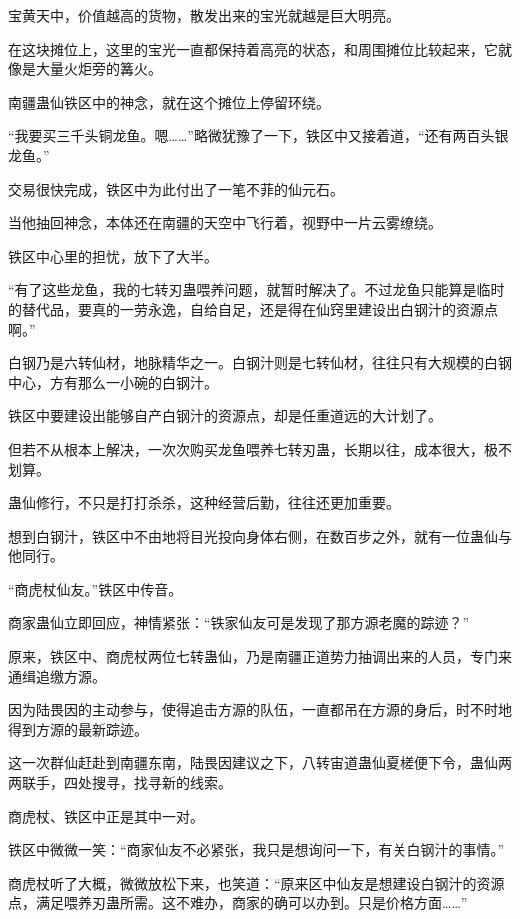 
\begin{this_body}

宝黄天中，价值越高的货物，散发出来的宝光就越是巨大明亮。

在这块摊位上，这里的宝光一直都保持着高亮的状态，和周围摊位比较起来，它就像是大量火炬旁的篝火。

南疆蛊仙铁区中的神念，就在这个摊位上停留环绕。

“我要买三千头铜龙鱼。嗯……”略微犹豫了一下，铁区中又接着道，“还有两百头银龙鱼。”

交易很快完成，铁区中为此付出了一笔不菲的仙元石。

当他抽回神念，本体还在南疆的天空中飞行着，视野中一片云雾缭绕。

铁区中心里的担忧，放下了大半。

“有了这些龙鱼，我的七转刃蛊喂养问题，就暂时解决了。不过龙鱼只能算是临时的替代品，要真的一劳永逸，自给自足，还是得在仙窍里建设出白钢汁的资源点啊。”

白钢乃是六转仙材，地脉精华之一。白钢汁则是七转仙材，往往只有大规模的白钢中心，方有那么一小碗的白钢汁。

铁区中要建设出能够自产白钢汁的资源点，却是任重道远的大计划了。

但若不从根本上解决，一次次购买龙鱼喂养七转刃蛊，长期以往，成本很大，极不划算。

蛊仙修行，不只是打打杀杀，这种经营后勤，往往还更加重要。

想到白钢汁，铁区中不由地将目光投向身体右侧，在数百步之外，就有一位蛊仙与他同行。

“商虎杖仙友。”铁区中传音。

商家蛊仙立即回应，神情紧张：“铁家仙友可是发现了那方源老魔的踪迹？”

原来，铁区中、商虎杖两位七转蛊仙，乃是南疆正道势力抽调出来的人员，专门来通缉追缴方源。

因为陆畏因的主动参与，使得追击方源的队伍，一直都吊在方源的身后，时不时地得到方源的最新踪迹。

这一次群仙赶赴到南疆东南，陆畏因建议之下，八转宙道蛊仙夏槎便下令，蛊仙两两联手，四处搜寻，找寻新的线索。

商虎杖、铁区中正是其中一对。

铁区中微微一笑：“商家仙友不必紧张，我只是想询问一下，有关白钢汁的事情。”

商虎杖听了大概，微微放松下来，也笑道：“原来区中仙友是想建设白钢汁的资源点，满足喂养刃蛊所需。这不难办，商家的确可以办到。只是价格方面……”


\end{this_body}
